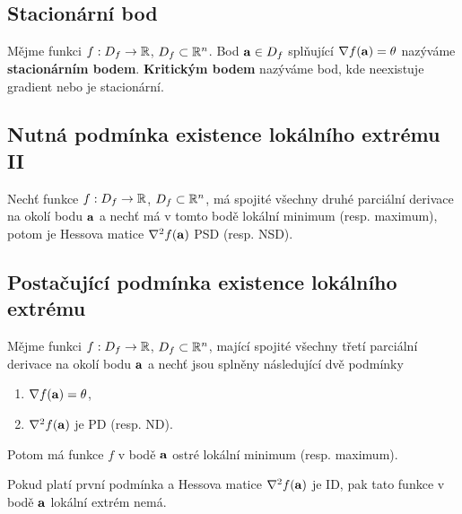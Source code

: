 \subsection*{Stacionární bod}

Mějme funkci $f: D_f \to \mathbb{R}$, $D_f \subset \mathbb{R}^n$. Bod $\mathbf{a} \in D_f$ splňující
$\nabla f(\mathbf{a}) = \theta$ nazýváme \textbf{stacionárním bodem}.
\textbf{Kritickým bodem} nazýváme bod, kde neexistuje gradient nebo je
stacionární.

\subsection*{Nutná podmínka existence lokálního extrému II}

Nechť funkce $f: D_f \to \mathbb{R}$, $D_f \subset \mathbb{R}^n$, má spojité všechny druhé parciální derivace na okolí bodu $\mathbf{a}$ a nechť má v tomto bodě lokální minimum (resp. maximum), potom je Hessova matice $\nabla^2 f(\mathbf{a})$ PSD (resp. NSD).

\subsection*{Postačující podmínka existence lokálního extrému}

Mějme funkci $f: D_f \to \mathbb{R}$, $D_f \subset \mathbb{R}^n$, mající spojité všechny třetí parciální derivace na okolí bodu $\mathbf{a}$ a nechť jsou splněny následující dvě podmínky

\begin{enumerate}
    \item $\nabla f(\mathbf{a}) = \theta$,
    \item $\nabla^2 f(\mathbf{a})$ je PD (resp. ND).
\end{enumerate}

\noindent Potom má funkce $f$ v bodě $\mathbf{a}$ ostré lokální minimum (resp. maximum).

\noindent Pokud platí první podmínka a Hessova matice $\nabla^2 f(\mathbf{a})$ je ID, pak tato funkce v bodě $\mathbf{a}$ lokální extrém nemá.

\pagebreak